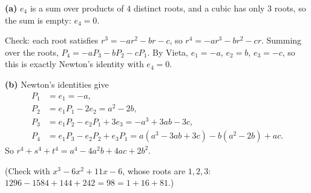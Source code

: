 \textbf{(a)} $e_4$ is a sum over products of $4$ distinct roots, and a cubic has only $3$ roots, so the sum is empty: $\boxed{e_4=0}$.

Check: each root satisfies $r^3=-ar^2-br-c$, so $r^4=-ar^3-br^2-cr$. Summing over the roots, $P_4=-aP_3-bP_2-cP_1$. By Vieta, $e_1=-a$, $e_2=b$, $e_3=-c$, so this is exactly Newton's identity with $e_4=0$.

\textbf{(b)} Newton's identities give
\begin{align*}
P_1&=e_1=-a,\\
P_2&=e_1P_1-2e_2=a^2-2b,\\
P_3&=e_1P_2-e_2P_1+3e_3=-a^3+3ab-3c,\\
P_4&=e_1P_3-e_2P_2+e_3P_1=a\left(a^3-3ab+3c\right)-b\left(a^2-2b\right)+ac.
\end{align*}
So $r^4+s^4+t^4=\boxed{a^4-4a^2b+4ac+2b^2}$.

(Check with $x^3-6x^2+11x-6$, whose roots are $1,2,3$: $1296-1584+144+242=98=1+16+81$.)
